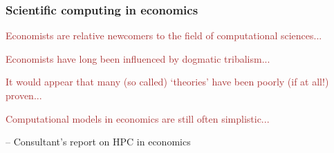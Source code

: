 \documentclass[
    xcolor={svgnames,dvipsnames},
    hyperref={colorlinks, citecolor=DeepPink4, linkcolor=DarkRed, urlcolor=DarkBlue}
    ]{beamer}  %
\newcommand{\brown}[1]{\textcolor{Brown}{\sf #1}}
\newcommand{\1}{\mathbbm 1}
\begin{document}
\begin{frame}
    \frametitle{Scientific computing in economics}

    \brown{Economists are relative newcomers to the
        field of computational sciences...}

            \vspace{0.3em}
    \brown{Economists have long been influenced by dogmatic tribalism...}

            \vspace{0.3em}
    \brown{It would appear that many (so called) `theories' have been poorly
    (if at all!) proven...}

            \vspace{0.3em}
    \brown{Computational models in economics are still often simplistic...}

    \vspace{0.3em}
    \vspace{0.3em}
    \vspace{0.3em}
    \begin{center}
        -- Consultant's report on HPC in economics
    \end{center}

\end{frame}


\end{document}
